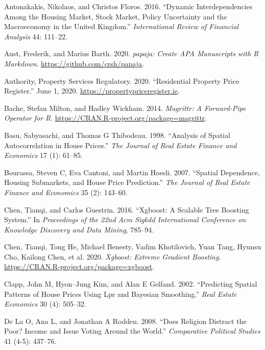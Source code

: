 \documentclass[conference,final,]{IEEEtran}
\begin{document}
\hypertarget{refs}{}
\leavevmode\hypertarget{ref-antonakakis2016dynamic}{}%
Antonakakis, Nikolaos, and Christos Floros. 2016. ``Dynamic Interdependencies Among the Housing Market, Stock Market, Policy Uncertainty and the Macroeconomy in the United Kingdom.'' \emph{International Review of Financial Analysis} 44: 111--22.

\leavevmode\hypertarget{ref-R-papaja}{}%
Aust, Frederik, and Marius Barth. 2020. \emph{papaja: Create APA Manuscripts with R Markdown}. \url{https://github.com/crsh/papaja}.

\leavevmode\hypertarget{ref-rppr2020}{}%
Authority, Property Services Regulatory. 2020. ``Residential Property Price Register.'' June 1, 2020. \url{https://propertypriceregister.ie}.

\leavevmode\hypertarget{ref-R-magrittr}{}%
Bache, Stefan Milton, and Hadley Wickham. 2014. \emph{Magrittr: A Forward-Pipe Operator for R}. \url{https://CRAN.R-project.org/package=magrittr}.

\leavevmode\hypertarget{ref-basu1998analysis}{}%
Basu, Sabyasachi, and Thomas G Thibodeau. 1998. ``Analysis of Spatial Autocorrelation in House Prices.'' \emph{The Journal of Real Estate Finance and Economics} 17 (1): 61--85.

\leavevmode\hypertarget{ref-bourassa2007spatial}{}%
Bourassa, Steven C, Eva Cantoni, and Martin Hoesli. 2007. ``Spatial Dependence, Housing Submarkets, and House Price Prediction.'' \emph{The Journal of Real Estate Finance and Economics} 35 (2): 143--60.

\leavevmode\hypertarget{ref-chen2016xgboost}{}%
Chen, Tianqi, and Carlos Guestrin. 2016. ``Xgboost: A Scalable Tree Boosting System.'' In \emph{Proceedings of the 22nd Acm Sigkdd International Conference on Knowledge Discovery and Data Mining}, 785--94.

\leavevmode\hypertarget{ref-R-xgboost}{}%
Chen, Tianqi, Tong He, Michael Benesty, Vadim Khotilovich, Yuan Tang, Hyunsu Cho, Kailong Chen, et al. 2020. \emph{Xgboost: Extreme Gradient Boosting}. \url{https://CRAN.R-project.org/package=xgboost}.

\leavevmode\hypertarget{ref-clapp2002predicting}{}%
Clapp, John M, Hyon--Jung Kim, and Alan E Gelfand. 2002. ``Predicting Spatial Patterns of House Prices Using Lpr and Bayesian Smoothing.'' \emph{Real Estate Economics} 30 (4): 505--32.

\leavevmode\hypertarget{ref-de2008does}{}%
De La O, Ana L, and Jonathan A Rodden. 2008. ``Does Religion Distract the Poor? Income and Issue Voting Around the World.'' \emph{Comparative Political Studies} 41 (4-5): 437--76.
\end{document}
